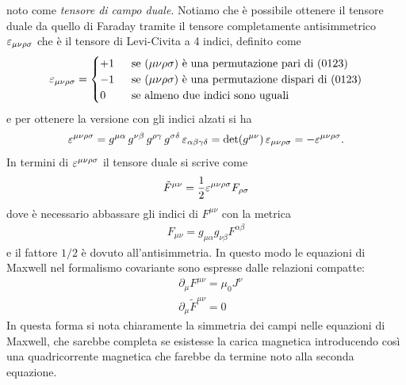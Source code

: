 noto come \textit{tensore di campo duale}. Notiamo che è possibile ottenere il tensore duale da quello di Faraday tramite il tensore completamente 
antisimmetrico $ \varepsilon_{\mu \nu \rho \sigma} $ che è il tensore di Levi-Civita a 4 indici, definito come 
\begin{align}
  \varepsilon_{\mu \nu \rho \sigma} = 
  \begin{cases}
    +1 &\;\; \textnormal{se $ (\mu \nu \rho \sigma) $ è una permutazione pari di $ (0123) $} \\
    -1 &\;\; \textnormal{se $ (\mu \nu \rho \sigma) $ è una permutazione dispari di $ (0123) $} \\
    0 &\;\; \textnormal{se almeno due indici sono uguali}
  \end{cases}
\end{align}
e per ottenere la versione con gli indici alzati si ha
\begin{align}
  \varepsilon^{\mu \nu \rho \sigma} = g^{\mu \alpha} \, g^{\nu \beta} \, g^{\rho \gamma} \, g^{\sigma \delta} \, \varepsilon_{\alpha \beta \gamma \delta} 
  = \det(g^{\mu \nu})\, \varepsilon_{\mu \nu \rho \sigma} = - \varepsilon^{\mu \nu \rho \sigma}.
\end{align}
In termini di $ \varepsilon^{\mu \nu \rho \sigma} $ il tensore duale si scrive come
\begin{align}
  \tilde{F}^{\mu \nu} = \frac{1}{2} \varepsilon^{\mu \nu \rho \sigma} F_{\rho \sigma}
\end{align}
dove è necessario abbassare gli indici di $ F^{\mu \nu} $ con la metrica
\begin{align}
  F_{\mu \nu} = g_{\mu \alpha} g_{\nu \beta} F^{\alpha \beta}
\end{align}
e il fattore $ 1/2 $ è dovuto all'antisimmetria. In questo modo le equazioni di Maxwell nel formalismo covariante sono espresse dalle relazioni compatte:
\begin{align}
  &\partial_\mu F^{\mu \nu} = \mu_0 {J^\nu} 
  \\
  &\partial_\mu \tilde{F}^{\mu \nu} = 0
\end{align}
In questa forma si nota chiaramente la simmetria dei campi nelle equazioni di Maxwell, che sarebbe completa se esistesse la carica magnetica introducendo 
così una quadricorrente magnetica che farebbe da termine noto alla seconda equazione.

